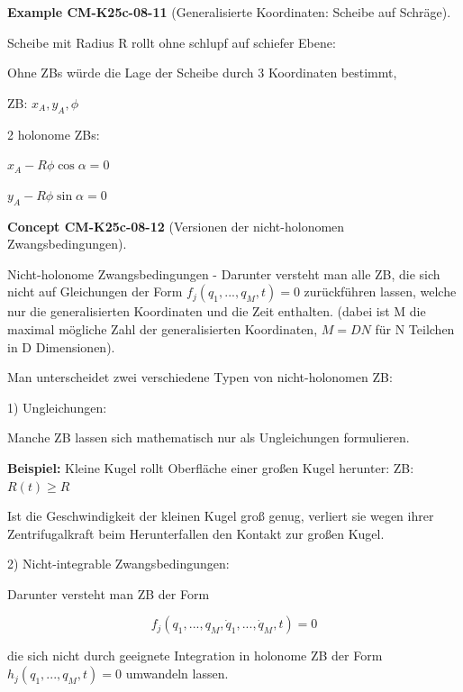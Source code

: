 \documentclass[10pt, letterpaper]{article}
\newcommand{\CustomHeading}[3]{%
  \par\medskip\noindent%
  \textbf{#1 #2} \textnormal{(#3)}.\enskip%
}
\newenvironment{EXA}[2]{\CustomHeading{Example}{#1}{#2}}{}
\newenvironment{CONC}[2]{\CustomHeading{Concept}{#1}{#2}}{}
\begin{document}
\begin{EXA}{CM-K25c-08-11}{Generalisierte Koordinaten: Scheibe auf Schräge}
Scheibe mit Radius R rollt ohne schlupf auf schiefer Ebene:


Ohne ZBs würde die Lage der Scheibe durch 3 Koordinaten bestimmt,

ZB: $x_A, y_A, \phi$

2 holonome ZBs:

$x_A - R\phi \cos\alpha = 0$

$y_A - R\phi \sin\alpha = 0$
\end{EXA}

\begin{CONC}{CM-K25c-08-12}{Versionen der nicht-holonomen Zwangsbedingungen}
Nicht-holonome Zwangsbedingungen - Darunter versteht man alle ZB, die sich nicht auf Gleichungen der Form $f_j(q_1,...,q_M,t)=0$ zurückführen lassen, welche nur die generalisierten Koordinaten und die Zeit enthalten. (dabei ist M die maximal mögliche Zahl der generalisierten Koordinaten, $M=DN$ für N Teilchen in D Dimensionen).

Man unterscheidet zwei verschiedene Typen von nicht-holonomen ZB:

1) Ungleichungen:

Manche ZB lassen sich mathematisch nur als Ungleichungen formulieren.

\textbf{Beispiel:} Kleine Kugel rollt Oberfläche einer großen Kugel herunter:
ZB: $R(t) \geq R$

Ist die Geschwindigkeit der kleinen Kugel groß genug, verliert sie wegen ihrer Zentrifugalkraft beim Herunterfallen den Kontakt zur großen Kugel.

2) Nicht-integrable Zwangsbedingungen:

Darunter versteht man ZB der Form

\[f_j(q_1,...,q_M,\dot{q}_1,...,\dot{q}_M,t) = 0\]

die sich nicht durch geeignete Integration in holonome ZB der Form $h_j(q_1,...,q_M,t)=0$ umwandeln lassen.
\end{CONC}
\end{document}
